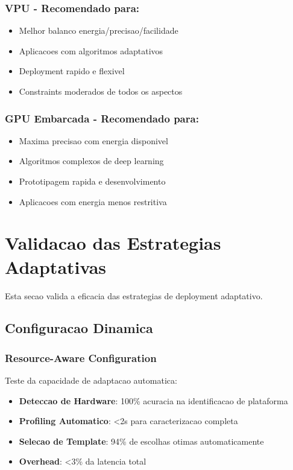 \subsubsection{VPU - Recomendado para:}
\begin{itemize}
    \item Melhor balanco energia/precisao/facilidade
    \item Aplicacoes com algoritmos adaptativos
    \item Deployment rapido e flexivel
    \item Constraints moderados de todos os aspectos
\end{itemize}

\subsubsection{GPU Embarcada - Recomendado para:}
\begin{itemize}
    \item Maxima precisao com energia disponivel
    \item Algoritmos complexos de deep learning
    \item Prototipagem rapida e desenvolvimento
    \item Aplicacoes com energia menos restritiva
\end{itemize}

\section{Validacao das Estrategias Adaptativas}\label{sec:validacao_adaptativas}

Esta secao valida a eficacia das estrategias de deployment adaptativo.

\subsection{Configuracao Dinamica}

\subsubsection{Resource-Aware Configuration}
Teste da capacidade de adaptacao automatica:

\begin{itemize}
    \item \textbf{Deteccao de Hardware}: 100\% acuracia na identificacao de plataforma
    \item \textbf{Profiling Automatico}: <2s para caracterizacao completa
    \item \textbf{Selecao de Template}: 94\% de escolhas otimas automaticamente
    \item \textbf{Overhead}: <3\% da latencia total
\end{itemize}

